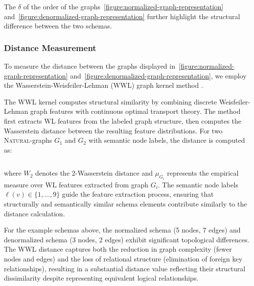 The $\delta$ of the order of the graphs~\ref{figure:normalized-graph-representation}
and~\ref{figure:denormalized-graph-representation}
further highlight the structural difference between the two schemas.

\subsubsection{Distance Measurement}

To measure the distance between the graphs displayed in~\ref{figure:normalized-graph-representation}
and~\ref{figure:denormalized-graph-representation}, we employ the
Wasserstein-Weisfeiler-Lehman (WWL) graph kernel method \cite{WWL}. %

The WWL kernel computes structural similarity by combining discrete Weisfeiler-Lehman
graph features with continuous optimal transport theory. The method first extracts
WL features from the labeled graph structure, then computes the Wasserstein distance
between the resulting feature distributions. For two \textsc{Natural}-graphs $G_1$ and $G_2$
with semantic node labels, the distance is computed as:

\begin{equation}
\end{equation}

where $W_2$ denotes the 2-Wasserstein distance and $\mu_{G_i}$ represents the empirical
measure over WL features extracted from graph $G_i$. The semantic node labels
$\ell(v) \in \{1, \ldots, 9\}$ guide the feature extraction process, ensuring that
structurally and semantically similar schema elements contribute similarly to the
distance calculation.

For the example schemas above, the normalized schema (5 nodes, 7 edges) and
denormalized schema (3 nodes, 2 edges) exhibit significant topological differences.
The WWL distance captures both the reduction in graph complexity (fewer nodes and edges)
and the loss of relational structure (elimination of foreign key relationships),
resulting in a substantial distance value reflecting their structural dissimilarity
despite representing equivalent logical relationships.


